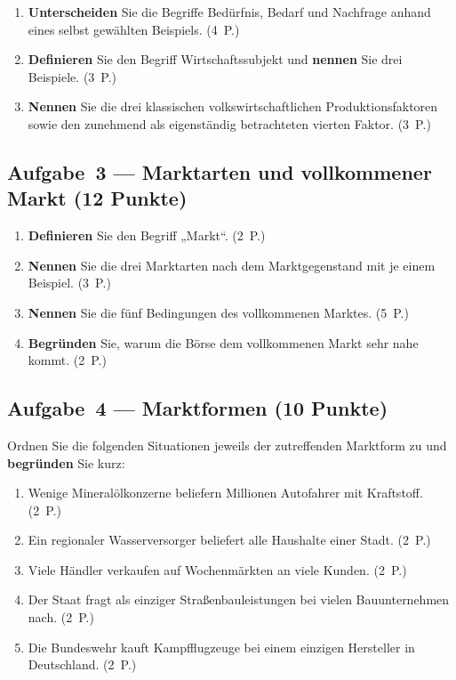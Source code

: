 \documentclass[11pt, a4paper]{article}
\begin{document}
\begin{enumerate}[label=(\alph*)]
  \item \textbf{Unterscheiden} Sie die Begriffe Bedürfnis, Bedarf und Nachfrage anhand eines selbst gewählten Beispiels. \hfill (4~P.)
  \item \textbf{Definieren} Sie den Begriff Wirtschaftssubjekt und \textbf{nennen} Sie drei Beispiele. \hfill (3~P.)
  \item \textbf{Nennen} Sie die drei klassischen volkswirtschaftlichen Produktionsfaktoren sowie den zunehmend als eigenständig betrachteten vierten Faktor. \hfill (3~P.)
\end{enumerate}

\subsection*{Aufgabe~3 --- Marktarten und vollkommener Markt (12 Punkte)}

\begin{enumerate}[label=(\alph*)]
  \item \textbf{Definieren} Sie den Begriff „Markt``. \hfill (2~P.)
  \item \textbf{Nennen} Sie die drei Marktarten nach dem Marktgegenstand mit je einem Beispiel. \hfill (3~P.)
  \item \textbf{Nennen} Sie die fünf Bedingungen des vollkommenen Marktes. \hfill (5~P.)
  \item \textbf{Begründen} Sie, warum die Börse dem vollkommenen Markt sehr nahe kommt. \hfill (2~P.)
\end{enumerate}

\subsection*{Aufgabe~4 --- Marktformen (10 Punkte)}

Ordnen Sie die folgenden Situationen jeweils der zutreffenden Marktform zu und
\textbf{begründen} Sie kurz:

\begin{enumerate}[label=(\alph*)]
  \item Wenige Mineralölkonzerne beliefern Millionen Autofahrer mit Kraftstoff. \hfill (2~P.)
  \item Ein regionaler Wasserversorger beliefert alle Haushalte einer Stadt. \hfill (2~P.)
  \item Viele Händler verkaufen auf Wochenmärkten an viele Kunden. \hfill (2~P.)
  \item Der Staat fragt als einziger Straßenbauleistungen bei vielen Bauunternehmen nach. \hfill (2~P.)
  \item Die Bundeswehr kauft Kampfflugzeuge bei einem einzigen Hersteller in Deutschland. \hfill (2~P.)
\end{enumerate}
\end{document}
